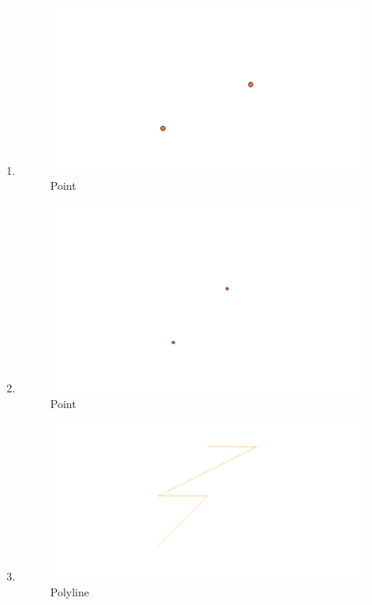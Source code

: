 \begin{enumerate}
	\item 
	
	\begin{figure}[H]
		\includegraphics[width=12cm]{figures/1174056/3.PNG}
		\centering
		\caption{Point}
	\end{figure}
	
	\item 
	
	\begin{figure}[H]
		\includegraphics[width=12cm]{figures/1174056/4.PNG}
		\centering
		\caption{Point}
	\end{figure}
	
	\item 
	
	\begin{figure}[H]
		\includegraphics[width=12cm]{figures/1174056/5.PNG}
		\centering
		\caption{Polyline}
	\end{figure}
	

\end{enumerate}
